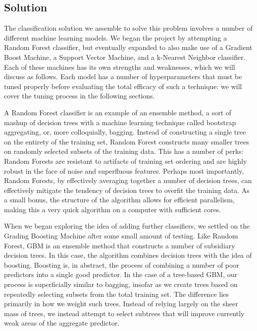 \subsection{Solution}
The classification solution we assemble to solve this problem involves 
a number of different machine learning models.  We began the project by 
attempting a Random Forest classifier, but eventually expanded to also 
make use of a Gradient Boost Machine, a Support Vector Machine, and a 
k-Nearest Neighbor classifier.  Each of these machines has its own 
strengths and weaknesses, which we will discuss as follows.  Each model 
has a number of hyperparameters that must be tuned properly before 
evaluating the total efficacy of such a technique: we will cover the 
tuning process in the following sections.

A Random Forest classifier\cite{breiman2001random} is an example of an 
ensemble method, a sort of mashup of decision trees with a machine 
learning technique called bootstrap aggregating, or, more colloquially, 
bagging\cite{bagging}.  Instead of constructing a single tree on the 
entirety of the training set, Random Forest constructs many smaller 
trees on randomly selected subsets of the training data.  This has a 
number of perks: Random Forests are resistant to artifacts of training 
set ordering and are highly robust in the face of noise and superfluous 
features.  Perhaps most importantly, Random Forests, by effectively 
averaging together a number of decision trees, can effectively mitigate 
the tendency of decision trees to overfit the training data.  As a 
small bonus, the structure of the algorithm allows for efficient 
parallelism, making this a very quick algorithm on a computer with 
sufficient cores.

When we began exploring the idea of adding further classifiers, we 
settled on the Grading Boosting Machine\cite{gbm} after some small 
amount of testing.  Like Random Forest, GBM is an ensemble method that 
constructs a number of subsidiary decision trees.  In this case, the 
algorithm combines decision trees with the idea of 
boosting\cite{boosting}.  Boosting is, in abstract, the process of 
combining a number of poor predictors into a single good predictor.  
In the case of a tree-based GBM, our process is superficially similar 
to bagging, insofar as we create trees based on repeatedly selecting 
subsets from the total training set.  The difference lies primarily in 
how we weight such trees.  Instead of relying largely on the sheer mass 
of trees, we instead attempt to select subtrees that will improve 
currently weak areas of the aggregate predictor.

